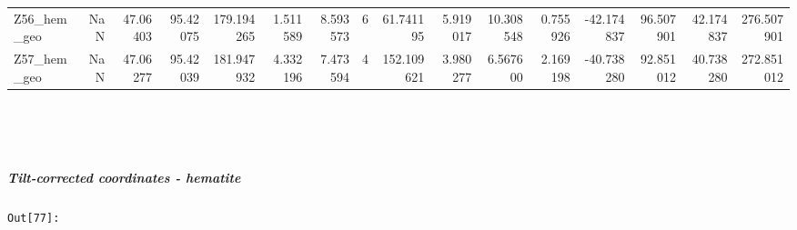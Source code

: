 \documentclass[11pt]{article}
\begin{document}
\begin{sidewaystable}
{\begin{tabular}{lrrrrrrrrrrrrrrr}
Z56\_hem\_geo &        NaN &  47.06403 &  95.42075 &  179.194265 &   1.511589 &   8.593573 &  6 &   61.741195 &  5.919017 &  10.308548 &       0.755926 & -42.174837 &   96.507901 &    42.174837 &   276.507901 \\
Z57\_hem\_geo &        NaN &  47.06277 &  95.42039 &  181.947932 &   4.332196 &   7.473594 &  4 &  152.109621 &  3.980277 &   6.567600 &       2.169198 & -40.738280 &   92.851012 &    40.738280 &   272.851012 \\
\bottomrule
\end{tabular}}
\end{sidewaystable}
    


    \begin{center}
    \end{center}
    { \hspace*{\fill} \\}
    

    \begin{center}
    \end{center}
    { \hspace*{\fill} \\}
    
    \subparagraph{Tilt-corrected coordinates -
hematite}\label{tilt-corrected-coordinates---hematite}

\texttt{\color{outcolor}Out[{\color{outcolor}77}]:}
    
\end{document}
